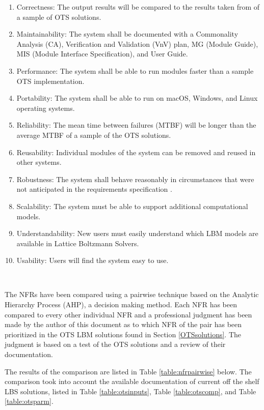 \documentclass[12pt]{article}
\newcommand{\famname}{Lattice Boltzmann Solvers} %
\begin{document}
\begin{enumerate}
\item Correctness: The output results will be compared to the results taken from of a sample of OTS solutions.
\item Maintainability: The system shall be documented with a Commonality Analysis (CA), Verification and Validation (VnV) plan, MG (Module Guide), MIS (Module Interface Specification), and User Guide.
\item Performance: The system shall be able to run modules faster than a sample OTS implementation.
\item Portability: The system shall be able to run on macOS, Windows, and Linux operating systems.
\item Reliability: The mean time between failures (MTBF) will be longer than the average MTBF of a sample of the OTS solutions.
\item Reusability: Individual modules of the system can be removed and reused in other systems.
\item Robustness: The system shall behave reasonably in circumstances that were not anticipated in the requirements specification \cite{ghezzi1991fundamentals}.
\item Scalability: The system must be able to support additional computational models.
\item Understandability: New users must easily understand which LBM models are available in {\famname}.
\item Usability: Users will find the system easy to use.
\end{enumerate}

~\newpage

The NFRs have been compared using a pairwise technique based on the Analytic Hierarchy Process (AHP), a decision making method. Each NFR has been compared to every other individual NFR and a professional judgment has been made by the author of this document as to which NFR of the pair has been prioritized in the OTS LBM solutions found in Section \ref{OTSsolutions}. The judgment is based on a test of the OTS solutions and a review of their documentation.

The results of the comparison are listed in Table \ref{table:nfrpairwise} below. The comparison took into account the available documentation of current off the shelf LBS solutions, listed in Table \ref{table:otsinputs}, Table \ref{table:otscomp}, and Table \ref{table:otsparm}.
\\
\end{document}
